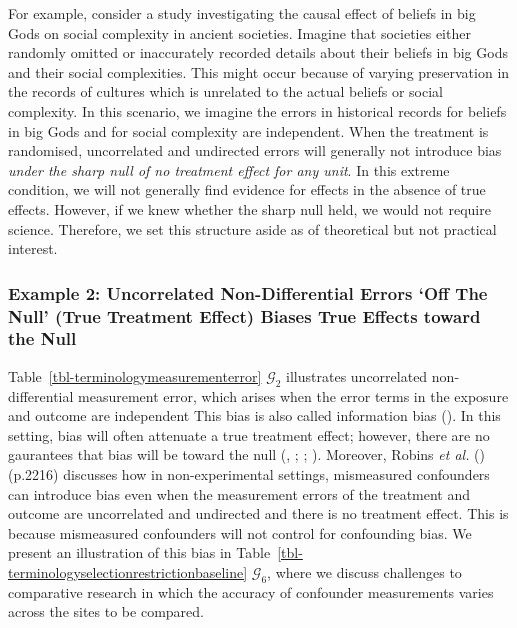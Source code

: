\documentclass[
  single column]{article}
\begin{document}
For example, consider a study investigating the causal effect of beliefs
in big Gods on social complexity in ancient societies. Imagine that
societies either randomly omitted or inaccurately recorded details about
their beliefs in big Gods and their social complexities. This might
occur because of varying preservation in the records of cultures which
is unrelated to the actual beliefs or social complexity. In this
scenario, we imagine the errors in historical records for beliefs in big
Gods and for social complexity are independent. When the treatment is
randomised, uncorrelated and undirected errors will generally not
introduce bias \emph{under the sharp null of no treatment effect for any
unit}. In this extreme condition, we will not generally find evidence
for effects in the absence of true effects. However, if we knew whether
the sharp null held, we would not require science. Therefore, we set
this structure aside as of theoretical but not practical interest.

\subsubsection{Example 2: Uncorrelated Non-Differential Errors `Off The
Null' (True Treatment Effect) Biases True Effects toward the
Null}\label{example-2-uncorrelated-non-differential-errors-off-the-null-true-treatment-effect-biases-true-effects-toward-the-null}

Table~\ref{tbl-terminologymeasurementerror} \(\mathcal{G}_2\)
illustrates uncorrelated non-differential measurement error, which
arises when the error terms in the exposure and outcome are independent
This bias is also called information bias
(). In this
setting, bias will often attenuate a true treatment effect; however,
there are no gaurantees that bias will be toward the null
(,
;
;
).
Moreover, Robins \emph{et al.} ()
(p.2216) discusses how in non-experimental settings, mismeasured
confounders can introduce bias even when the measurement errors of the
treatment and outcome are uncorrelated and undirected and there is no
treatment effect. This is because mismeasured confounders will not
control for confounding bias. We present an illustration of this bias in
Table~\ref{tbl-terminologyselectionrestrictionbaseline}
\(\mathcal{G}_6\), where we discuss challenges to comparative research
in which the accuracy of confounder measurements varies across the sites
to be compared.
\end{document}
